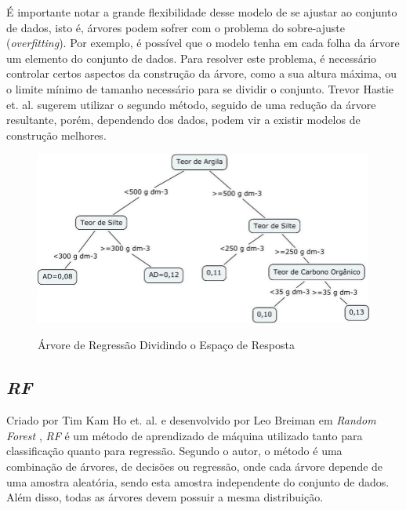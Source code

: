 É importante notar a grande flexibilidade desse modelo de se ajustar ao conjunto de dados, isto é, árvores podem sofrer com o problema do sobre-ajuste (\textit{overfitting}). Por exemplo, é possível que o modelo tenha em cada folha da árvore um elemento do conjunto de dados. Para resolver este problema, é necessário controlar certos aspectos da construção da árvore, como a sua altura máxima, ou o limite mínimo de tamanho necessário para se dividir o conjunto. Trevor Hastie et. al. \cite{hastie2005elements} sugerem utilizar o segundo método, seguido de uma redução da árvore resultante, porém, dependendo dos dados, podem vir a existir modelos de construção melhores.
 
 \begin{figure}[htbp]
    \centering
    \includegraphics[width=\linewidth]{monography/img/models/regression_tree.png}
    \label{figure:tree}
    \caption[Árvore de Regressão Dividindo o Espaço de Resposta]{Árvore de Regressão Dividindo o Espaço de Resposta\footnotemark}
\end{figure}


\subsection{\textit{\acrfull{RF}}}

Criado por Tim Kam Ho et. al. \cite{ho_1995} e desenvolvido por Leo Breiman em \textit{Random Forest} \cite{Breiman:2001:RF:570181.570182}, \textit{\acrshort{RF}} é um método de aprendizado de máquina utilizado tanto para classificação quanto para regressão. Segundo o autor, o método é uma combinação de árvores, de decisões ou regressão, onde cada árvore depende de uma amostra aleatória, sendo esta amostra independente do conjunto de dados. Além disso, todas as árvores devem possuir a mesma distribuição. 


